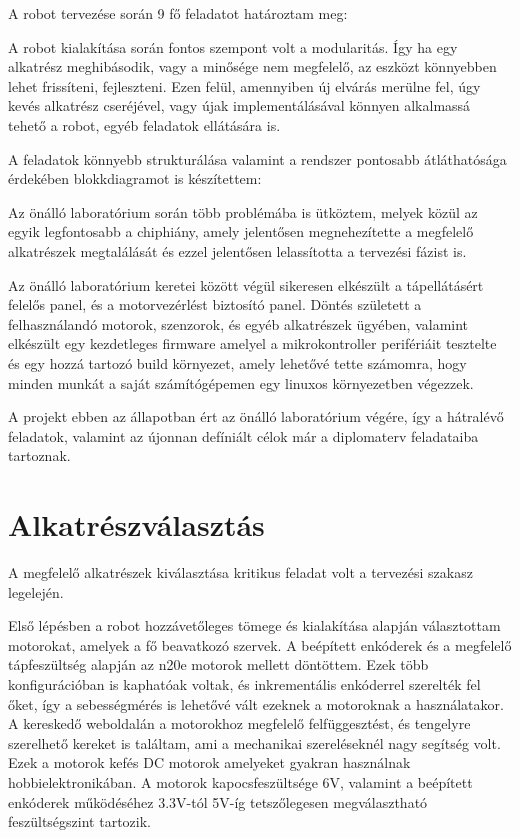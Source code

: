 A robot tervezése során 9 fő feladatot határoztam meg:

A robot kialakítása során fontos szempont volt a modularitás. Így ha egy
alkatrész meghibásodik, vagy a minősége nem megfelelő, az eszközt könnyebben
lehet frissíteni, fejleszteni. Ezen felül, amennyiben új elvárás merülne fel,
úgy kevés alkatrész cseréjével, vagy újak implementálásával könnyen alkalmassá
tehető a robot, egyéb feladatok ellátására is.

A feladatok könnyebb strukturálása valamint a rendszer pontosabb átláthatósága
érdekében blokkdiagramot is készítettem:


Az önálló laboratórium során több problémába is ütköztem, melyek közül az egyik
legfontosabb a chiphiány, amely jelentősen megnehezítette a  megfelelő
alkatrészek megtalálását és ezzel jelentősen lelassította a tervezési fázist is.

Az önálló laboratórium keretei között végül sikeresen elkészült a tápellátásért
felelős panel, és a motorvezérlést biztosító panel. Döntés született a
felhasználandó motorok, szenzorok, és egyéb alkatrészek ügyében, valamint
elkészült egy kezdetleges firmware amelyel a mikrokontroller perifériáit
tesztelte és egy hozzá tartozó build környezet, amely lehetővé tette számomra,
hogy minden munkát a saját számítógépemen egy linuxos környezetben végezzek.

A projekt ebben az állapotban ért az önálló laboratórium végére, így a hátralévő
feladatok, valamint az újonnan defíniált célok már a diplomaterv feladataiba
tartoznak.

\section{Alkatrészválasztás}

A megfelelő alkatrészek kiválasztása kritikus feladat volt a tervezési szakasz
legelején.

Első lépésben a robot hozzávetőleges tömege és kialakítása alapján választottam
motorokat, amelyek a fő beavatkozó szervek. A beépített enkóderek és a megfelelő
tápfeszültség alapján az n20e motorok mellett döntöttem. Ezek több
konfigurációban is kaphatóak voltak, és inkrementális enkóderrel szerelték fel
őket, így a sebességmérés is lehetővé vált ezeknek a motoroknak a használatakor.
A kereskedő weboldalán a motorokhoz megfelelő felfüggesztést, és tengelyre
szerelhető kereket is találtam, ami a mechanikai szereléseknél nagy segítség
volt. Ezek a motorok kefés DC motorok amelyeket gyakran használnak
hobbielektronikában. A motorok kapocsfeszültsége 6V, valamint a beépített
enkóderek működéséhez 3.3V-tól 5V-íg tetszőlegesen megválasztható feszültségszint
tartozik.


